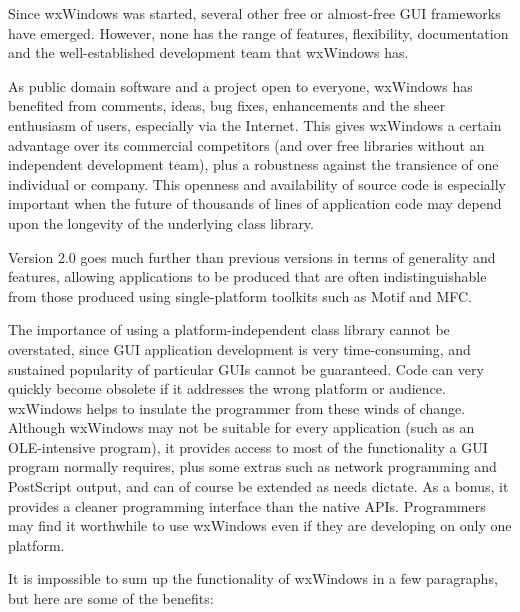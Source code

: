 Since wxWindows was started, several other free or almost-free GUI frameworks have
emerged. However, none has the range of features, flexibility, documentation and the
well-established development team that wxWindows has.

As public domain software and a project open to everyone, wxWindows has
benefited from comments, ideas, bug fixes, enhancements and the sheer
enthusiasm of users, especially via the Internet. This gives wxWindows a
certain advantage over its commercial competitors (and over free libraries
without an independent development team), plus a robustness against
the transience of one individual or company. This openness and
availability of source code is especially important when the future of
thousands of lines of application code may depend upon the longevity of
the underlying class library.

Version 2.0 goes much further than previous versions in terms of generality and features,
allowing applications to be produced
that are often indistinguishable from those produced using single-platform
toolkits such as Motif and MFC.

The importance of using a platform-independent class library cannot be
overstated, since GUI application development is very time-consuming,
and sustained popularity of particular GUIs cannot be guaranteed.
Code can very quickly become obsolete if it addresses the wrong
platform or audience.  wxWindows helps to insulate the programmer from
these winds of change. Although wxWindows may not be suitable for
every application (such as an OLE-intensive program), it provides access to most of the functionality a
GUI program normally requires, plus some extras such as network programming
and PostScript output, and can of course be extended as needs dictate.  As a bonus, it provides
a cleaner programming interface than the native
APIs. Programmers may find it worthwhile to use wxWindows even if they
are developing on only one platform.

It is impossible to sum up the functionality of wxWindows in a few paragraphs, but
here are some of the benefits:

